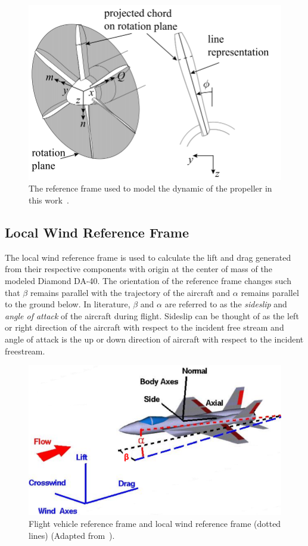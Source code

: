 \begin{figure}[!ht]
    \centering
    \includegraphics[width=0.75\linewidth]{Figures/propframe.png}
    \caption{The reference frame used to model the dynamic of the propeller in this work~\cite{vanarnhemEngineeringMethodEstimate2020}.}\label{fig:propframe}
\end{figure}

\subsection{\textbf{Local Wind Reference Frame}}
The local wind reference frame is used to calculate the lift and drag generated from their respective components with origin at the center of mass of the modeled Diamond DA-40. The orientation of the reference frame changes such that \(\beta \) remains parallel with the trajectory of the aircraft and \(\alpha \) remains parallel to the ground below. In literature, \( \beta \) and \(\alpha \) are referred to as the \textit{sideslip} and \textit{angle of attack} of the aircraft during flight. Sideslip can be thought of as the left or right direction of the aircraft with respect to the incident free stream and angle of attack is the up or down direction of aircraft with respect to the incident freestream.

\begin{figure}[!ht]
    \centering
    \includegraphics[width=0.75\linewidth]{Figures/windaxes.png}
    \caption{Flight vehicle reference frame and local wind reference frame (dotted lines) (Adapted from~\cite{ForceBalanceCoordinates1969}).}\label{fig:windframe}
\end{figure}

